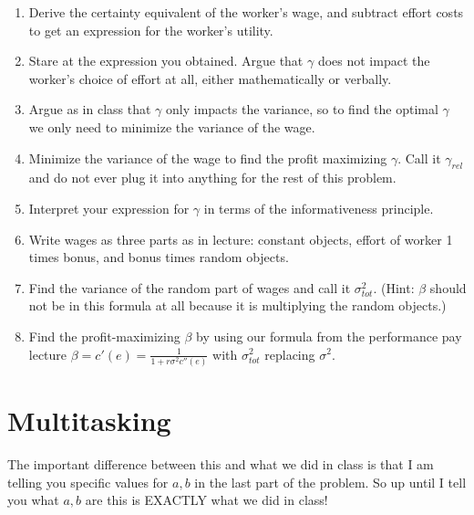 \documentclass{article}
\begin{document}
\begin{enumerate}
    \item Derive the certainty equivalent of the worker's wage, and subtract effort costs to get an expression for the worker's utility.

    \item Stare at the expression you obtained. Argue that $\gamma$ does not impact the worker's choice of effort at all, either mathematically or verbally.

    \item Argue as in class that $\gamma$ only impacts the variance, so to find the optimal $\gamma$ we only need to minimize the variance of the wage.

    \item Minimize the variance of the wage to find the profit maximizing $\gamma$. Call it $\gamma_{rel}$ and do not ever plug it into anything for the rest of this problem.
    \item Interpret your expression for $\gamma$ in terms of the informativeness principle.
    \item Write wages as three parts as in lecture: constant objects, effort of worker 1 times bonus, and bonus times random objects.
    \item Find the variance of the random part of wages and call it $\sigma^2_{tot}$. (Hint: $\beta$ should not be in this formula at all because it is multiplying the random objects.)
    \item Find the profit-maximizing $\beta$ by using our formula from the performance pay lecture $\beta=c'(e)=\frac{1}{1+r\sigma^2c''(e)}$ with $\sigma^2_{tot}$ replacing $\sigma^2$.
\end{enumerate}
\section{Multitasking}
The important difference between this and what we did in class is that I am telling you specific values for $a,b$ in the last part of the problem. So up until I tell you what $a,b$ are this is EXACTLY what we did in class!
\end{document}
